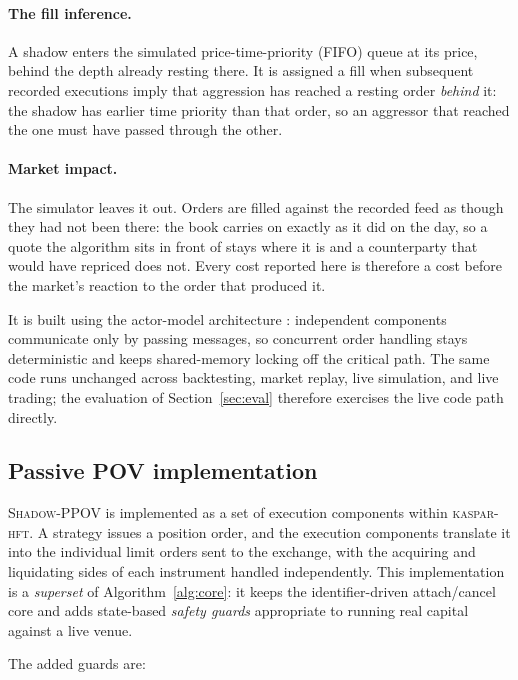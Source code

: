 \documentclass[11pt]{article}
\newcommand{\pov}{\textsc{Shadow-PPOV}}
\begin{document}
\paragraph{The fill inference.}
A shadow enters the simulated price-time-priority (FIFO) queue at its price, behind
the depth already resting there. It is assigned a fill when subsequent recorded
executions imply that aggression has reached a resting order \emph{behind} it:
the shadow has earlier time priority than that order, so an aggressor that
reached the one must have passed through the other.

\paragraph{Market impact.} The simulator leaves it out. Orders are filled
against the recorded feed as though they had not been there: the book carries on
exactly as it did on the day, so a quote the algorithm sits in front of stays
where it is and a counterparty that would have repriced does not. Every cost
reported here is therefore a cost before the market's reaction to the order that
produced it.

It is built using the actor-model architecture
\cite{hewitt1973,agha1986}: independent components communicate
only by passing messages, so concurrent order handling stays deterministic and
keeps shared-memory locking off the critical path. The same code runs unchanged
across backtesting, market replay, live simulation, and live trading; the
evaluation of Section~\ref{sec:eval} therefore exercises the live code path
directly.

\subsection{Passive POV implementation}

\pov{} is implemented as a set of execution components within
\textsc{kaspar-hft}. A strategy issues a position order, and the execution
components translate it into the individual limit orders sent to the exchange,
with the acquiring and liquidating sides of each instrument handled
independently. This implementation is a \emph{superset} of
Algorithm~\ref{alg:core}: it keeps the identifier-driven attach/cancel core and
adds state-based \emph{safety guards} appropriate to running real capital
against a live venue.

The added guards are:
\end{document}
